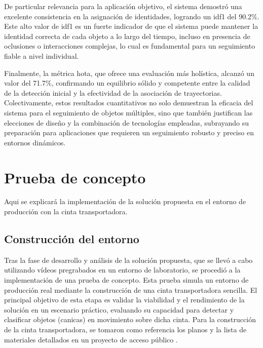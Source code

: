 \documentclass[11pt,spanish,listoffigures,listoftables]{tfgetsinf}
\begin{document}
De particular relevancia para la aplicación objetivo, el sistema demostró una excelente consistencia en la asignación de identidades, logrando un \gls{idf1} del 90.2\%. Este alto valor de \gls{idf1} es un fuerte indicador de que el sistema puede mantener la identidad correcta de cada objeto a lo largo del tiempo, incluso en presencia de oclusiones o interacciones complejas, lo cual es fundamental para un seguimiento fiable a nivel individual.

Finalmente, la métrica \gls{hota}, que ofrece una evaluación más holística, alcanzó un valor del 71.7\%, confirmando un equilibrio sólido y competente entre la calidad de la detección inicial y la efectividad de la asociación de trayectorias.
Colectivamente, estos resultados cuantitativos no solo demuestran la eficacia del sistema para el seguimiento de objetos múltiples, sino que también justifican las elecciones de diseño y la combinación de tecnologías empleadas, subrayando su preparación para aplicaciones que requieren un seguimiento robusto y preciso en entornos dinámicos.

\chapter{Prueba de concepto} \label{chap:prueba_concepto}
Aqui se explicará la implementación de la solución propuesta en el entorno de producción con la cinta transportadora.

\section{Construcción del entorno} \label{sub:construccion_entorno}
Tras la fase de desarrollo y análisis de la solución propuesta, que se llevó a cabo utilizando vídeos pregrabados en un entorno de laboratorio, se procedió a la implementación de una prueba de concepto. Esta prueba simula un entorno de producción real mediante la construcción de una cinta transportadora sencilla. El principal objetivo de esta etapa es validar la viabilidad y el rendimiento de la solución en un escenario práctico, evaluando su capacidad para detectar y clasificar objetos (canicas) en movimiento sobre dicha cinta. Para la construcción de la cinta transportadora, se tomaron como referencia los planos y la lista de materiales detallados en un proyecto de acceso público \cite{hackster_counting_inspection}.
\end{document}
